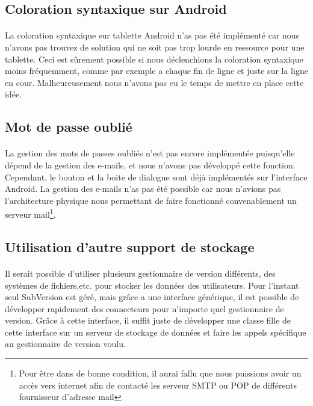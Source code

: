 \documentclass[a4paper,12pt]{article}
\begin{document}
\subsection{Coloration syntaxique sur Android}
\paragraph*{}
La coloration syntaxique sur tablette Android n'as pas été implémenté car nous n'avons pas trouvez de solution qui ne soit pas trop lourde en ressource pour une tablette. Ceci est sûrement possible si nous déclenchions la coloration syntaxique moins fréquemment, comme par exemple a chaque fin de ligne et juste sur la ligne en cour. Malheureusement nous n'avons pas eu le temps de mettre en place cette idée.


\subsection{Mot de passe oublié}
\paragraph*{}
La gestion des mots de passes oubliés n'est pas encore implémentée puisqu'elle dépend de la gestion des e-mails, et nous n'avons pas développé cette fonction. Cependant, le bouton et la boite de dialogue sont déjà implémentés sur l'interface Android. La gestion des e-mails n'as pas été possible car nous n'avions pas l'architecture physique nous permettant de faire fonctionné convenablement un serveur mail\footnote{Pour être dans de bonne condition, il aurai fallu que nous puissions avoir un accès vers internet afin de contacté les serveur SMTP ou POP de différents fournisseur d'adresse mail}.

\subsection{Utilisation d'autre support de stockage}
\paragraph*{}
Il serait possible d'utiliser plusieurs gestionnaire de version différents, des systèmes de fichiers,etc. pour stocker les données des utilisateurs. Pour l'instant seul SubVersion est géré, mais grâce a une interface générique, il est possible de développer rapidement des connecteurs pour n'importe quel gestionnaire de version. Grâce à cette interface, il suffit juste de développer une classe fille de cette interface sur un serveur de stockage de données et faire les appels spécifique au gestionnaire de version voulu.
\end{document}
